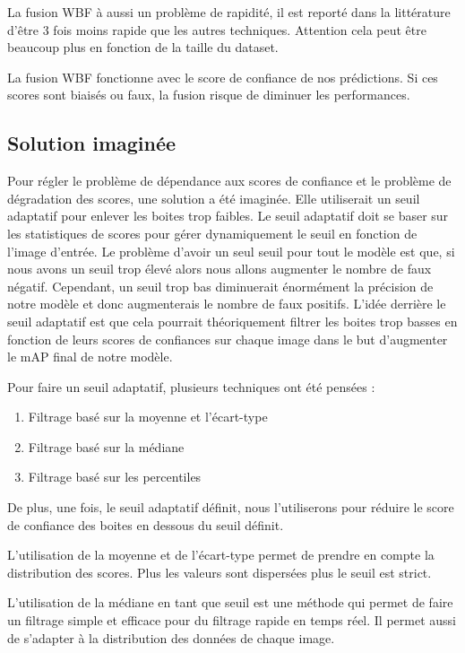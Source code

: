 \documentclass{article}
\begin{document}
La fusion WBF à aussi un problème de rapidité, il est reporté dans la littérature d'être 3 fois moins rapide que les autres techniques. Attention cela peut être beaucoup plus en fonction de la taille du dataset. 

La fusion WBF fonctionne avec le score de confiance de nos prédictions. Si ces scores sont biaisés ou faux, la fusion risque de diminuer les performances.


\subsection{Solution imaginée}
Pour régler le problème de dépendance aux scores de confiance et le problème de dégradation des scores, une solution a été imaginée. Elle utiliserait un seuil adaptatif pour enlever les boites trop faibles. 
Le seuil adaptatif doit se baser sur les statistiques de scores pour gérer dynamiquement le seuil en fonction de l'image d'entrée. Le problème d'avoir un seul seuil pour tout le modèle est que, si nous avons un seuil trop élevé alors nous allons augmenter le nombre de faux négatif. Cependant, un seuil trop bas diminuerait énormément la précision de notre modèle et donc augmenterais le nombre de faux positifs.
L'idée derrière le seuil adaptatif est que cela pourrait théoriquement filtrer les boites trop basses en fonction de leurs scores de confiances sur chaque image dans le but d'augmenter le mAP final de notre modèle.

Pour faire un seuil adaptatif, plusieurs techniques ont été pensées : 
\begin{enumerate}
    \item Filtrage basé sur la moyenne et l'écart-type
    \item Filtrage basé sur la médiane
    \item Filtrage basé sur les percentiles 
\end{enumerate}
De plus, une fois, le seuil adaptatif définit, nous l'utiliserons pour réduire le score de confiance des boites en dessous du seuil définit. 

L'utilisation de la moyenne et de l'écart-type permet de prendre en compte la distribution des scores. Plus les valeurs sont dispersées plus le seuil est strict.

L'utilisation de la médiane en tant que seuil est une méthode qui permet de faire un filtrage simple et efficace pour du filtrage rapide en temps réel. Il permet aussi de s'adapter à la distribution des données de chaque image.
\end{document}
